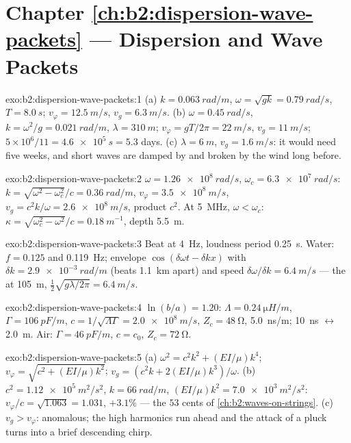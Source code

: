 \section*{Chapter \ref{ch:b2:dispersion-wave-packets} --- Dispersion and Wave Packets}

\begin{solution}{exo:b2:dispersion-wave-packets:1}
(a) $k = \qty{0.063}{rad/m}$, $\omega = \sqrt{gk} = \qty{0.79}{rad/s}$, $T = \qty{8.0}{s}$;
$v_\varphi = \qty{12.5}{m/s}$, $v_g = \qty{6.3}{m/s}$. (b) $\omega = \qty{0.45}{rad/s}$, $k = \omega^2
/g = \qty{0.021}{rad/m}$, $\lambda = \qty{310}{m}$; $v_\varphi = gT/2\pi = \qty{22}{m/s}$, $v_g =
\qty{11}{m/s}$; $5 \times 10^6/11 = \qty{4.6e5}{s} = 5.3$ days. (c) $\lambda = \qty{6}{m}$, $v_g
= \qty{1.6}{m/s}$: it would need five weeks, and short waves are damped
by  and broken by the wind long before.
\end{solution}

\begin{solution}{exo:b2:dispersion-wave-packets:2}
$\omega = \qty{1.26e8}{rad/s}$, $\omega_c = \qty{6.3e7}{rad/s}$: $k = \sqrt{\omega^2 - \omega_c^2}/c =
\qty{0.36}{rad/m}$, $v_\varphi = \qty{3.5e8}{m/s}$, $v_g = c^2k/\omega = \qty{2.6e8}{m/s}$,
product $c^2$. At \qty{5}{MHz}, $\omega < \omega_c$: $\kappa = \sqrt{\omega_c^2 - \omega^2}/c =
\qty{0.18}{m^{-1}}$, depth \qty{5.5}{m}.
\end{solution}

\begin{solution}{exo:b2:dispersion-wave-packets:3}
Beat at \qty{4}{Hz}, loudness period \qty{0.25}{s}. Water: $f = 0.125$ and
\qty{0.119}{Hz}; envelope $\cos(\delta\omega t - \delta kx)$ with $\delta k = \qty{2.9e-3}{rad/m}$
(beats \qty{1.1}{km} apart) and speed $\delta\omega/\delta k = \qty{6.4}{m/s}$ --- the
 at \qty{105}{m}, $\tfrac12\sqrt{g\lambda/2\pi} = \qty{6.4}{m/s}$.
\end{solution}

\begin{solution}{exo:b2:dispersion-wave-packets:4}
$\ln(b/a) = 1.20$: $\Lambda = \qty{0.24}{\micro H/m}$, $\Gamma = \qty{106}{pF/m}$, $c = 1/
\sqrt{\Lambda\Gamma} = \qty{2.0e8}{m/s}$, $Z_c = \qty{48}{\ohm}$, \qty{5.0}{ns/m}; \qty{10}{ns}
$\leftrightarrow$ \qty{2.0}{m}. Air: $\Gamma = \qty{46}{pF/m}$, $c = c_0$, $Z_c = \qty{72}{\ohm}$.
\end{solution}

\begin{solution}{exo:b2:dispersion-wave-packets:5}
(a) $\omega^2 = c^2k^2 + (EI/\mu)k^4$; $v_\varphi = \sqrt{c^2 + (EI/\mu)k^2}$; $v_g = (c^2k +
2(EI/\mu)k^3)/\omega$. (b) $c^2 = \qty{1.12e5}{m^2/s^2}$, $k = \qty{66}{rad/m}$, $(EI/\mu)k^2
= \qty{7.0e3}{m^2/s^2}$: $v_\varphi/c = \sqrt{1.063} = 1.031$, $+3.1\%$ --- the $53$ cents of
\cref{ch:b2:waves-on-strings}. (c) $v_g > v_\varphi$: anomalous; the high
harmonics run ahead and the attack of a pluck turns into a brief
descending chirp.
\end{solution}


